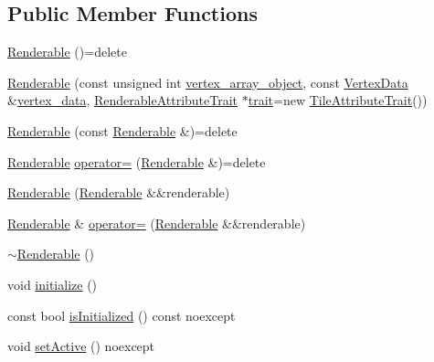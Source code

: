 \subsection*{Public Member Functions}
\begin{DoxyCompactItemize}
\item 
\hyperlink{class_graphics_1_1_renderable_a2c99d41631558194811f6f4c61a7f464}{Renderable} ()=delete
\item 
\hyperlink{class_graphics_1_1_renderable_a366de19f0399ad70ba8afcd20af693fa}{Renderable} (const unsigned int \hyperlink{class_graphics_1_1_renderable_aabfa91ebff7b10decd54119d663044ef}{vertex\+\_\+array\+\_\+object}, const \hyperlink{class_graphics_1_1_vertex_data}{Vertex\+Data} \&\hyperlink{class_graphics_1_1_renderable_a5077fe6a71021f0bd4ebc8d24cdf544b}{vertex\+\_\+data}, \hyperlink{class_graphics_1_1_renderable_attribute_trait}{Renderable\+Attribute\+Trait} $\ast$\hyperlink{class_graphics_1_1_renderable_ad0715144ebe93916b1344c286c4a9a38}{trait}=new \hyperlink{class_graphics_1_1_tile_attribute_trait}{Tile\+Attribute\+Trait}())
\item 
\hyperlink{class_graphics_1_1_renderable_a7db48c39efa99650480cca6376bbf6c6}{Renderable} (const \hyperlink{class_graphics_1_1_renderable}{Renderable} \&)=delete
\item 
\hyperlink{class_graphics_1_1_renderable}{Renderable} \hyperlink{class_graphics_1_1_renderable_aa96e579c501d01462f5ee2ed5e949311}{operator=} (\hyperlink{class_graphics_1_1_renderable}{Renderable} \&)=delete
\item 
\hyperlink{class_graphics_1_1_renderable_a7edf9a0c89593ab500d5107e89f7bbae}{Renderable} (\hyperlink{class_graphics_1_1_renderable}{Renderable} \&\&renderable)
\item 
\hyperlink{class_graphics_1_1_renderable}{Renderable} \& \hyperlink{class_graphics_1_1_renderable_afac6ce4fffafffef11300fd13b763ef4}{operator=} (\hyperlink{class_graphics_1_1_renderable}{Renderable} \&\&renderable)
\item 
\hyperlink{class_graphics_1_1_renderable_a63470b6e63ed9f87690569833fb48617}{$\sim$\+Renderable} ()
\item 
void \hyperlink{class_graphics_1_1_renderable_a55acebe3070429de465efe2fd75c9c7e}{initialize} ()
\item 
const bool \hyperlink{class_graphics_1_1_renderable_a2f5b5d6076b854ac9b3d01a512d439fb}{is\+Initialized} () const noexcept
\item 
void \hyperlink{class_graphics_1_1_renderable_aab2e51991d63780654d7cc8a7083faca}{set\+Active} () noexcept

\end{DoxyCompactItemize}
